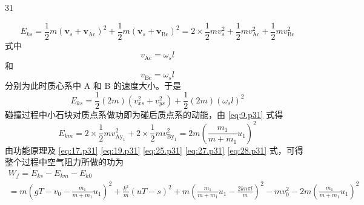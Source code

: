 \begin{solution}{31}
\begin{subsolution}
    \begin{equation}
      E_{k s} = \frac{1}{2} m (\boldsymbol{v}_{s} + \boldsymbol{v}_{\mathrm{Ac}})^{2} + \frac{1}{2} m (\boldsymbol{v}_{s} + \boldsymbol{v}_{\mathrm{Bc}})^{2} = 2 \times \frac{1}{2} m v_{s}^{2} + \frac{1}{2} m v_{\mathrm{Ac}}^{2} + \frac{1}{2} m v_{\mathrm{Bc}}^{2}
    \end{equation}
    式中
    \begin{equation}
      v_{\mathrm{Ac}} = \omega_{s} l
    \end{equation}
    和
    \begin{equation}
      v_{\mathrm{Bc}} = \omega_{s} l
    \end{equation}
    分别为此时质心系中 A 和 B 的速度大小。于是
    \begin{equation}
      E_{k s} = \frac{1}{2} (2 m) (v_{x s}^{2} + v_{y s}^{2}) + \frac{1}{2} (2 m) (\omega_{s} l)^{2}
      \label{eq:27.p31}
    \end{equation}
    碰撞过程中小石块对质点系做功即为碰后质点系的动能，由 \eqref{eq:9.p31} 式得
    \begin{equation}
      E_{k m} = 2 \times \frac{1}{2} m v_{\mathrm{Ay}_{1}}^{2} + 2 \times \frac{1}{2} m v_{\mathrm{By}_{1}}^{2} = 2 m (\frac{m_{1}}{m + m_{1}} u_{1})^{2}
      \label{eq:28.p31}
    \end{equation}
    由功能原理及 \eqref{eq:17.p31} \eqref{eq:19.p31} \eqref{eq:25.p31} \eqref{eq:27.p31} \eqref{eq:28.p31} 式，可得整个过程中空气阻力所做的功为
    \begin{equation}
      \begin{array}{l}
        W_{f} = E_{k s} - E_{k m} - E_{k 0} \\
        = m (g T - v_{0} - \frac{m_{1}}{m + m_{1}} u_{1})^{2} + \frac{k^{2}}{m} (u T - s)^{2} + m (\frac{m_{1}}{m + m_{1}} u_{1} - \frac{2 k n \pi l}{m})^{2} - m v_{0}^{2} - 2 m (\frac{m_{1}}{m + m_{1}} u_{1})^{2}
      \end{array}
      \label{eq:29.p31}
    \end{equation}
  \end{subsolution}
\end{solution}